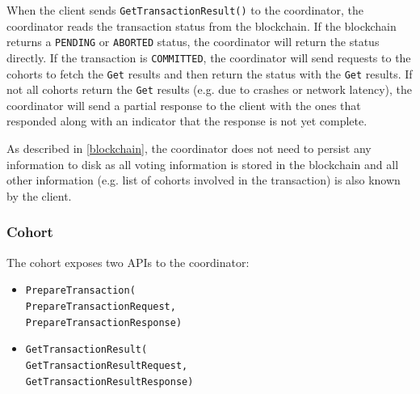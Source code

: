 \documentclass[11pt,sigplan,screen,nonacm]{acmart}
\begin{document}
When the client sends \texttt{GetTransactionResult()} to the coordinator, the coordinator reads the transaction status from the blockchain. If the blockchain returns a \texttt{PENDING} or \texttt{ABORTED} status, the coordinator will return the status directly. If the transaction is \texttt{COMMITTED}, the coordinator will send requests to the cohorts to fetch the \texttt{Get} results and then return the status with the \texttt{Get} results. If not all cohorts return the \texttt{Get} results (e.g. due to crashes or network latency), the coordinator will send a partial response to the client with the ones that responded along with an indicator that the response is not yet complete.

As described in \ref{blockchain}, the coordinator does not need to persist any information to disk as all voting information is stored in the blockchain and all other information (e.g. list of cohorts involved in the transaction) is also known by the client.

\subsubsection{Cohort} \label{cohort}
The cohort exposes two APIs to the coordinator:
\begin{itemize}
  \item \texttt{PrepareTransaction(\\PrepareTransactionRequest,\\PrepareTransactionResponse)}
  \item \texttt{GetTransactionResult(\\GetTransactionResultRequest,\\GetTransactionResultResponse)}
\end{itemize} 
\end{document}
